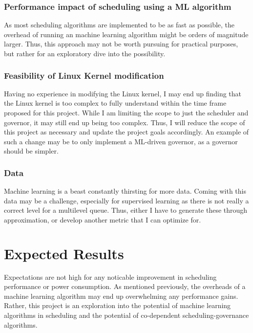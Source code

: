 \documentclass[12pt]{article}
\def\ind{\hspace*{0.3in}}
\begin{document}
\subsubsection*{Performance impact of scheduling using a ML algorithm}
\ind As most scheduling algorithms are implemented to be as fast as possible, the overhead of running an machine learning algorithm might be orders of magnitude larger. Thus, this approach may not be worth pursuing for practical purposes, but rather for an exploratory dive into the possibility.
\subsubsection*{Feasibility of Linux Kernel modification}
\ind Having no experience in modifying the Linux kernel, I may end up finding that the Linux kernel is too complex to fully understand within the time frame proposed for this project. While I am limiting the scope to just the scheduler and governor, it may still end up being too complex. Thus, I will reduce the scope of this project as necessary and update the project goals accordingly. An example of such a change may be to only implement a ML-driven governor, as a governor should be simpler.
\subsubsection*{Data}
Machine learning is a beast constantly thirsting for more data. Coming with this data may be a challenge, especially for supervised learning as there is not really a correct level for a multilevel queue. Thus, either I have to generate these through approximation, or develop another metric that I can optimize for.

\section*{Expected Results}

Expectations are not high for any noticable improvement in scheduling performance or power consumption. As mentioned previously, the overheads of a machine learning algorithm may end up overwhelming any performance gains. Rather, this project is an exploration into the potential of machine learning algorithms in scheduling and the potential of co-dependent scheduling-governance algorithms.

{}

\end{document}
